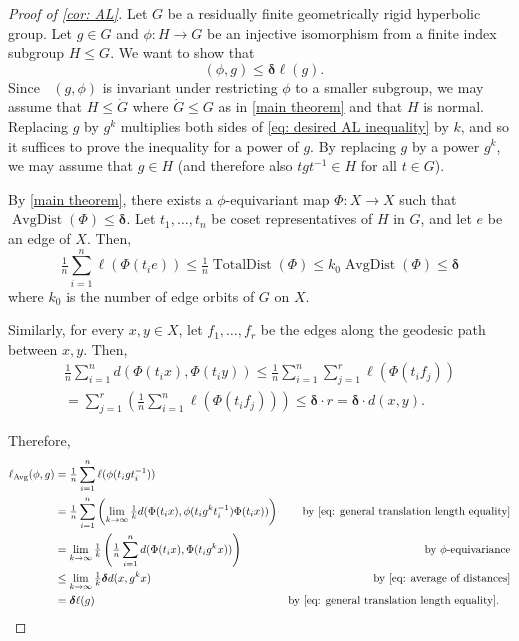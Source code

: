 \documentclass{amsart}
\numberwithin{equation}{section}
\theoremstyle{definition}
\newcommand{\ii}{^{-1}}
\newcommand{\bdelta}{{\boldsymbol\delta}}
\DeclareMathOperator{\AD}{AvgDist}
\DeclareMathOperator{\TD}{TotalDist}
\DeclareMathOperator{\AL}{\ell_{Avg}}
\begin{document}
\begin{proof}[Proof of \cref{cor: AL}]
Let $G$ be a residually finite geometrically rigid hyperbolic group. 
Let $g\in G$ and $\phi:H\to G$ be an injective isomorphism from a finite index subgroup $H\le G$. 
We want to show that \begin{equation}\label{eq: desired AL inequality} \AL(\phi,g)\le \bdelta \ell(g).\end{equation}
Since $\AL(g,\phi)$ is invariant under restricting $\phi$ to a smaller subgroup, we may assume that $H\le \dot G$ where $\dot G\le G$ as in \cref{main theorem} and that $H$ is normal.
Replacing $g$ by $g^k$ multiplies both sides of \eqref{eq: desired AL inequality} by $k$, and so it suffices to prove the inequality for a power of $g$. 
By replacing $g$ by a power $g^k$, we may assume that $g \in H$ (and therefore also $tgt\ii\in H$ for all $t\in G$).


By \cref{main theorem}, there exists a $\phi$-equivariant map $\Phi:X\to X$ such that $\AD(\Phi)\le \bdelta$.
Let $t_1,\dots,t_n$ be coset representatives of $H$ in $G$, and let $e$ be an edge of $X$. 
Then,
$$\tfrac1n\sum_{i=1}^n \ell(\Phi(t_i e))\le \tfrac 1n\TD(\Phi)\le k_0\AD(\Phi)\le \bdelta$$
where $k_0$ is the number of edge orbits of $G$ on $X$.

Similarly, for every $x,y\in X$, let $f_1,\dots,f_r$ be the edges along the geodesic path between $x,y$.
Then,
\begin{multline}\label{eq: average of distances}
    \tfrac 1 n\sum_{i=1}^nd(\Phi(t_ix),\Phi(t_iy))\le 
\tfrac 1 n\sum_{i=1}^n \sum _{j=1}^r\ell (\Phi(t_if_j))\\
= \sum _{j=1}^r\left(\tfrac 1 n\sum_{i=1}^n \ell (\Phi(t_if_j))\right)\le \bdelta \cdot r=\bdelta\cdot d(x,y).
\end{multline}

Therefore,
\begin{align*}
\AL(\phi,g)&=\tfrac 1n \sum_{i=1}^n\ell(\phi(t_i g t_i\ii))\\
&= \tfrac 1n \sum_{i=1}^n \left(\lim _{k\to \infty}\tfrac 1kd(\Phi(t_ix),\phi(t_ig^kt_i\ii)\Phi(t_i x))\right) &\text{by \eqref{eq: general translation length equality}}\\
&=\lim_{k\to \infty}\tfrac 1k \left(\tfrac 1n \sum_{i=1}^n d(\Phi(t_ix),\Phi(t_ig^kx))\right)&\text{by }\phi\text{-equivariance}\\
&\le \lim_{k\to \infty}\tfrac 1k \bdelta d(x, g^k x) &\text{by \eqref{eq: average of distances}}\\
&=\bdelta \ell(g) &\text{by \eqref{eq: general translation length equality}}.\quad \qedhere
\end{align*}
\end{proof}
\end{document}
